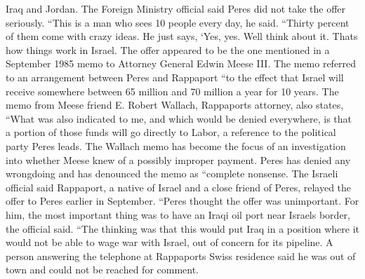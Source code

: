 \documentclass{article}
\begin{document}
\color[rgb]{0.8666666666666667,0.11372549019607843,0.5411764705882353}Iraq and Jordan. The \color[rgb]{0.9137254901960784,0.34509803921568627,0.1568627450980392}Foreign Ministry official said Peres did not take the offer seriously. ``This is a man who sees 10 people every day, he said. ``Thirty percent of them come with crazy ideas. He just says, `Yes, yes. Well think about it. Thats how things work in Israel. The offer appeared to be the one mentioned in a September 1985 memo to Attorney General Edwin Meese III. The memo referred to an arrangement between Peres and Rappaport ``to the effect that Israel will receive somewhere between 65 million and 70 million a year for 10 years. The memo from Meese friend E. Robert Wallach, Rappaports attorney, also states, ``What was also indicated to me, and which would be denied everywhere, is that a portion of those funds will go directly to Labor, a reference to the political party Peres leads. The Wallach memo has become the focus of an investigation into whether Meese knew of a possibly improper payment. Peres has denied any wrongdoing and has denounced the memo as ``complete nonsense. The Israeli official said Rappaport, a native of Israel and a close friend of Peres, relayed the offer to Peres earlier in September. ``Peres thought the offer was unimportant. For him, the most important thing was to have an \color[rgb]{0.8666666666666667,0.11372549019607843,0.5411764705882353}Iraqi oil \color[rgb]{0.9137254901960784,0.34509803921568627,0.1568627450980392}port near Israels border, the official said. ``The thinking was that this would put \color[rgb]{0.8666666666666667,0.11372549019607843,0.5411764705882353}Iraq in a \color[rgb]{0.9137254901960784,0.34509803921568627,0.1568627450980392}position where it would not be able to wage war with Israel, out of concern for its pipeline. A person answering the telephone at Rappaports Swiss residence said he was out of town and could not be reached for comment. 
\end{document}
